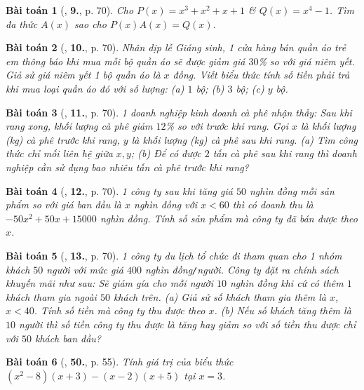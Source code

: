 \documentclass{article}
\numberwithin{equation}{section}
\newtheorem{baitoan}{Bài toán}
\begin{document}
\begin{baitoan}[\cite{SGK_Toan_7_Canh_Dieu_tap_2}, \textbf{9.}, p. 70]
	Cho $P(x) = x^3 + x^2 + x +1$ \& $Q(x) = x^4 - 1$. Tìm đa thức $A(x)$ sao cho $P(x)A(x) = Q(x)$. 
\end{baitoan}

\begin{baitoan}[\cite{SGK_Toan_7_Canh_Dieu_tap_2}, \textbf{10.}, p. 70]
	Nhân dịp lễ Giáng sinh, 1 cửa hàng bán quần áo trẻ em thông báo khi mua mỗi bộ quần áo sẽ được giảm giá $30$\% so với giá niêm yết. Giả sử giá niêm yết 1 bộ quần áo là $x$ đồng. Viết biểu thức tính số tiền phải trả khi mua loại quần áo đó với số lượng: (a) $1$ bộ; (b) $3$ bộ; (c) $y$ bộ.
\end{baitoan}

\begin{baitoan}[\cite{SGK_Toan_7_Canh_Dieu_tap_2}, \textbf{11.}, p. 70]
	1 doanh nghiệp kinh doanh cà phê nhận thấy: Sau khi rang xong, khối lượng cà phê giảm $12$\%  so với trước khi rang. Gọi $x$ là khối lượng (kg) cà phê trước khi rang, $y$ là khối lượng (kg) cà phê sau khi rang. (a) Tìm công thức chỉ mối liên hệ giữa $x,y$; (b) Để có được $2$ tấn cà phê sau khi rang thì doanh nghiệp cần sử dụng bao nhiêu tấn cà phê trước khi rang?
\end{baitoan}

\begin{baitoan}[\cite{SGK_Toan_7_Canh_Dieu_tap_2}, \textbf{12.}, p. 70]
	1 công ty sau khi tăng giá $50$ nghìn đồng mỗi sản phẩm so với giá ban đầu là $x$ nghìn đồng với $x < 60$ thì có doanh thu là $-50x^2 + 50x + 15000$ nghìn đồng. Tính số sản phẩm mà công ty đã bán được theo $x$.
\end{baitoan}

\begin{baitoan}[\cite{SGK_Toan_7_Canh_Dieu_tap_2}, \textbf{13.}, p. 70]
	1 công ty du lịch tổ chức đi tham quan cho 1 nhóm khách $50$ người với mức giá $400$ nghìn đồng\emph{\texttt{/}}người. Công ty đặt ra chính sách khuyến mãi như sau: Sẽ giảm gía cho mỗi người $10$ nghìn đồng khi cứ có thêm $1$ khách tham gia ngoài $50$ khách trên. (a) Giả sử số khách tham gia thêm là $x$, $x < 40$. Tính số tiền mà công ty thu được theo $x$. (b) Nếu số khách tăng thêm là $10$ người thì số tiền công ty thu được là tăng hay giảm so với số tiền thu được chỉ với $50$ khách ban đầu?
\end{baitoan}

\begin{baitoan}[\cite{SBT_Toan_7_Canh_Dieu_tap_2}, \textbf{50.}, p. 55]
	Tính giá trị của biểu thức $(x^2 - 8)(x + 3) - (x - 2)(x + 5)$ tại $x = 3$.
\end{baitoan}
\end{document}
